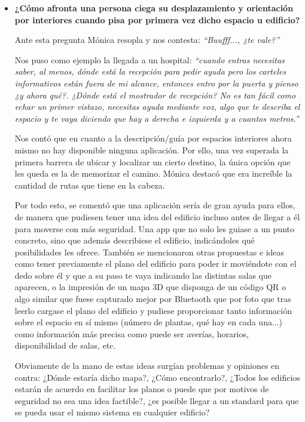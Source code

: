 \begin{itemize}
	\item \textbf{¿Cómo afronta una persona ciega su desplazamiento y orientación por interiores cuando pisa por primera vez dicho espacio u edificio?}
	
	Ante esta pregunta Mónica resopla y nos contesta: \textit{``Buufff..., ¿te vale?''}
	
	Nos puso como ejemplo la llegada a un hospital: \textit{``cuando entras necesitas saber, al menos, dónde está la recepción para pedir ayuda pero los carteles informativos están fuera de mi alcance, entonces entro por la puerta y pienso ¿y ahora qué?. ¿Dónde está el mostrador de recepción? No es tan fácil como echar un primer vistazo, necesitas ayuda mediante voz, algo que te describa el espacio y te vaya diciendo que hay a derecha e izquierda y a cuantos metros.''}

	Nos contó que en cuanto a la descripción/guía por espacios interiores ahora mismo no hay disponible ninguna aplicación. Por ello, una vez superada la primera barrera de ubicar y localizar un cierto destino, la única opción que les queda es la de memorizar el camino. Mónica destacó que era increíble la cantidad de rutas que tiene en la cabeza.
	
	Por todo esto, se comentó que una aplicación sería de gran ayuda para ellos, de manera que pudiesen tener una idea del edificio incluso antes de llegar a él para moverse con más seguridad. Una app que no solo les guiase a un punto concreto, sino que además describiese el edificio, indicándoles qué posibilidades les ofrece. También se mencionaron otras propuestas e ideas como tener previamente el plano del edificio para poder ir moviéndote con el dedo sobre él y que a su paso te vaya indicando las distintas salas que aparecen, o la impresión de un mapa 3D que disponga de un código QR o algo similar que fuese capturado mejor por Bluetooth que por foto que tras leerlo cargase el plano del edificio y pudiese proporcionar tanto información sobre el espacio en sí mismo (número de plantas, qué hay en cada una...) como información más precisa como puede ser averías, horarios, disponibilidad de salas, etc.
	 
	Obviamente de la mano de estas ideas surgían problemas y opiniones en contra: ¿Dónde estaría dicho mapa?, ¿Cómo encontrarlo?, ¿Todos los edificios estarán de acuerdo en facilitar los planos o puede que por motivos de seguridad no sea una idea factible?, ¿es posible llegar a un standard para que se pueda usar el mismo sistema en cualquier edificio?
	

\end{itemize}
